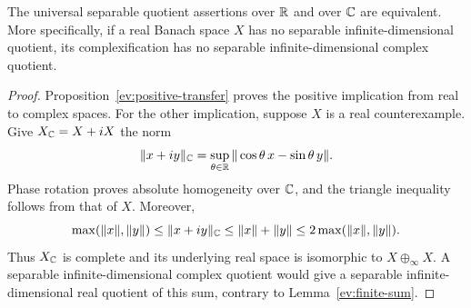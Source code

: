 \begin{corollary}\label{ev:fields}
The universal separable quotient assertions over $\mathbb R$ and over $\mathbb C$
are equivalent.  More specifically, if a real Banach space $X$ has no
separable infinite-dimensional quotient, its complexification has no
separable infinite-dimensional complex quotient.
\end{corollary}

\begin{proof}
Proposition~\ref{ev:positive-transfer} proves the positive implication
from real to complex spaces.  For the other implication, suppose $X$
is a real counterexample.  Give $X_{\mathbb C}=X+iX$ the norm
\[
 \|x+iy\|_{\mathbb C}
   =\sup_{\theta\in\mathbb R}\|\cos\theta\,x-\sin\theta\,y\|.
\]
Phase rotation proves absolute homogeneity over $\mathbb C$, and the triangle
inequality follows from that of $X$.  Moreover,
\[
 \max(\|x\|,\|y\|)\le\|x+iy\|_{\mathbb C}
 \le\|x\|+\|y\|\le2\max(\|x\|,\|y\|).
\]
Thus $X_{\mathbb C}$ is complete and its underlying real space is isomorphic to
$X\oplus_\infty X$.  A separable infinite-dimensional complex quotient
would give a separable infinite-dimensional real quotient of this sum,
contrary to Lemma~\ref{ev:finite-sum}.
\end{proof}
